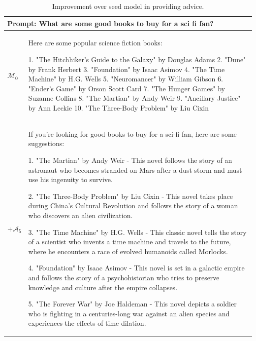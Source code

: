\begin{table}[t]

  \caption{Improvement over seed model in providing advice.
  \label{tab:example_outputs_3}
  }
  \centering
  \begin{tabular}{p{1em}l}
    \toprule
    \multicolumn{2}{l}{\begin{minipage}{40em}
\textbf{Prompt:}    
What are some  good books to buy for a sci fi fan? \end{minipage}} \\ 
     \midrule
    $\mathcal{M}_0$ & \begin{minipage}{40em}
\begin{lmttfont}
Here are some popular science fiction books:

1. "The Hitchhiker's Guide to the Galaxy" by Douglas Adams
2. "Dune" by Frank Herbert
3. "Foundation" by Isaac Asimov
4. "The Time Machine" by H.G. Wells
5. "Neuromancer" by William Gibson
6. "Ender's Game" by Orson Scott Card
7. "The Hunger Games" by Suzanne Collins
8. "The Martian" by Andy Weir
9. "Ancillary Justice" by Ann Leckie
10. "The Three-Body Problem" by Liu Cixin
\end{lmttfont}
    \end{minipage} \\
     \midrule  
   $+ \mathcal{A}_5$ & \begin{minipage}{40em}  
\begin{lmttfont}
If you're looking for good books to buy for a sci-fi fan, here are some suggestions:

1. "The Martian" by Andy Weir - This novel follows the story of an astronaut who becomes stranded on Mars after a dust storm and must use his ingenuity to survive.

2. "The Three-Body Problem" by Liu Cixin - This novel takes place during China's Cultural Revolution and follows the story of a woman who discovers an alien civilization.

3. "The Time Machine" by H.G. Wells - This classic novel tells the story of a scientist who invents a time machine and travels to the future, where he encounters a race of evolved humanoids called Morlocks.

4. "Foundation" by Isaac Asimov - This novel is set in a galactic empire and follows the story of a psychohistorian who tries to preserve knowledge and culture after the empire collapses.

5. "The Forever War" by Joe Haldeman - This novel depicts a soldier who is fighting in a centuries-long war against an alien species and experiences the effects of time dilation.


\end{lmttfont}
\end{minipage}
\end{tabular}
\end{table}
